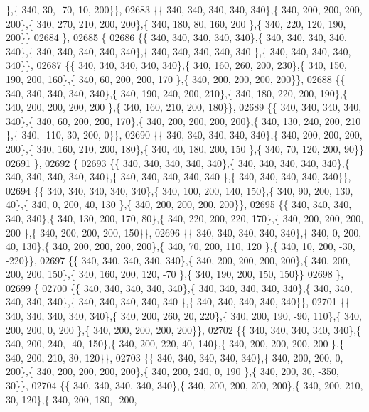 \begin{DoxyCode}
      \},\{ 340,  30, -70,  10, 200\}\},
02683 \{\{ 340, 340, 340, 340, 340\},\{ 340, 200, 200, 200, 200\},\{ 340, 270, 210, 200, 200\},\{ 340, 180,  80, 160, 200
      \},\{ 340, 220, 120, 190, 200\}\}
02684 \},
02685 \{
02686 \{\{ 340, 340, 340, 340, 340\},\{ 340, 340, 340, 340, 340\},\{ 340, 340, 340, 340, 340\},\{ 340, 340, 340, 340, 340
      \},\{ 340, 340, 340, 340, 340\}\},
02687 \{\{ 340, 340, 340, 340, 340\},\{ 340, 160, 260, 200, 230\},\{ 340, 150, 190, 200, 160\},\{ 340,  60, 200, 200, 170
      \},\{ 340, 200, 200, 200, 200\}\},
02688 \{\{ 340, 340, 340, 340, 340\},\{ 340, 190, 240, 200, 210\},\{ 340, 180, 220, 200, 190\},\{ 340, 200, 200, 200, 200
      \},\{ 340, 160, 210, 200, 180\}\},
02689 \{\{ 340, 340, 340, 340, 340\},\{ 340,  60, 200, 200, 170\},\{ 340, 200, 200, 200, 200\},\{ 340, 130, 240, 200, 210
      \},\{ 340, -110,  30, 200,   0\}\},
02690 \{\{ 340, 340, 340, 340, 340\},\{ 340, 200, 200, 200, 200\},\{ 340, 160, 210, 200, 180\},\{ 340,  40, 180, 200, 150
      \},\{ 340,  70, 120, 200,  90\}\}
02691 \},
02692 \{
02693 \{\{ 340, 340, 340, 340, 340\},\{ 340, 340, 340, 340, 340\},\{ 340, 340, 340, 340, 340\},\{ 340, 340, 340, 340, 340
      \},\{ 340, 340, 340, 340, 340\}\},
02694 \{\{ 340, 340, 340, 340, 340\},\{ 340, 100, 200, 140, 150\},\{ 340,  90, 200, 130,  40\},\{ 340,   0, 200,  40, 130
      \},\{ 340, 200, 200, 200, 200\}\},
02695 \{\{ 340, 340, 340, 340, 340\},\{ 340, 130, 200, 170,  80\},\{ 340, 220, 200, 220, 170\},\{ 340, 200, 200, 200, 200
      \},\{ 340, 200, 200, 200, 150\}\},
02696 \{\{ 340, 340, 340, 340, 340\},\{ 340,   0, 200,  40, 130\},\{ 340, 200, 200, 200, 200\},\{ 340,  70, 200, 110, 120
      \},\{ 340,  10, 200, -30, -220\}\},
02697 \{\{ 340, 340, 340, 340, 340\},\{ 340, 200, 200, 200, 200\},\{ 340, 200, 200, 200, 150\},\{ 340, 160, 200, 120, -70
      \},\{ 340, 190, 200, 150, 150\}\}
02698 \},
02699 \{
02700 \{\{ 340, 340, 340, 340, 340\},\{ 340, 340, 340, 340, 340\},\{ 340, 340, 340, 340, 340\},\{ 340, 340, 340, 340, 340
      \},\{ 340, 340, 340, 340, 340\}\},
02701 \{\{ 340, 340, 340, 340, 340\},\{ 340, 200, 260,  20, 220\},\{ 340, 200, 190, -90, 110\},\{ 340, 200, 200,   0, 200
      \},\{ 340, 200, 200, 200, 200\}\},
02702 \{\{ 340, 340, 340, 340, 340\},\{ 340, 200, 240, -40, 150\},\{ 340, 200, 220,  40, 140\},\{ 340, 200, 200, 200, 200
      \},\{ 340, 200, 210,  30, 120\}\},
02703 \{\{ 340, 340, 340, 340, 340\},\{ 340, 200, 200,   0, 200\},\{ 340, 200, 200, 200, 200\},\{ 340, 200, 240,   0, 190
      \},\{ 340, 200,  30, -350,  30\}\},
02704 \{\{ 340, 340, 340, 340, 340\},\{ 340, 200, 200, 200, 200\},\{ 340, 200, 210,  30, 120\},\{ 340, 200, 180, -200, 

\end{DoxyCode}
